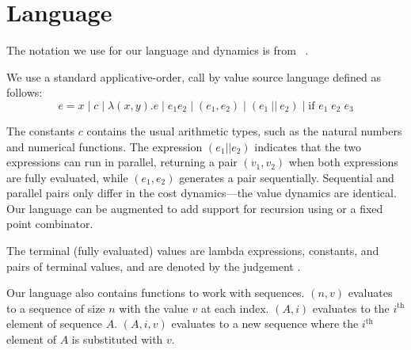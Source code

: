 \section{Language}
\label{sec:dynamics}

The notation we use for our language and dynamics is from ~\cite{pfpl2}.

We use a standard applicative-order, call by value source language defined as follows:
$$e = x \; | \; c  \; | \; \lambda (x,y).e \; 
| \; e_1 e_2 \; 
| \; (e_1, e_2) \; 
| \; (e_1~||~e_2) \; 
| \; \text{if } e_1 \; e_2 \; e_3$$

The constants $c$ contains the usual arithmetic types, such as the
natural numbers and numerical functions. The expression $(e_1||e_2)$
indicates that the two expressions can run in parallel, returning a
pair $(v_1, v_2)$ when both expressions are fully evaluated, while
$(e_1,e_2)$ generates a pair sequentially.  Sequential and parallel
pairs only differ in the cost dynamics---the value dynamics are
identical. Our language can be augmented to add support for recursion using  or a fixed point combinator.

\begin{definition}
The terminal (fully evaluated) values are lambda expressions, constants,
and pairs of terminal values, and are denoted by the judgement .
\end{definition}

Our language also contains functions to work with sequences. \new{}$(n,v)$ evaluates to a sequence of size $n$ with the value $v$ at each index. \get{}$(A, i)$ evaluates to the $i^{\text{th}}$ element of sequence $A$. \set{}$(A, i, v)$ evaluates to a new sequence where the $i^{\text{th}}$ element of $A$ is substituted with $v$.
